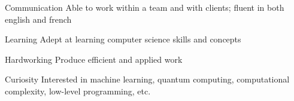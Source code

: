 

\begin{cvskills}

  \cvskill
    {Communication} %
    {Able to work within a team and with clients; fluent in both english and french}
    
  \cvskill
    {Learning} %
    {Adept at learning computer science skills and concepts}
    
  \cvskill
    {Hardworking} %
    {Produce efficient and applied work}
    
  \cvskill
    {Curiosity} %
    {Interested in machine learning, quantum computing, computational complexity, low-level programming, etc.}

\end{cvskills}
